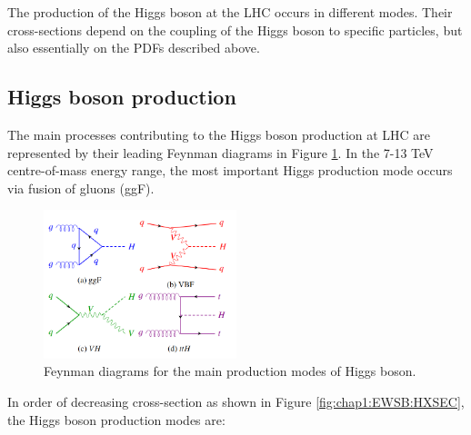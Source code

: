 The production of the Higgs boson at the LHC occurs in different modes. Their cross-sections depend on the coupling of the Higgs boson to specific particles, but also essentially on the PDFs described above.

\subsection{Higgs boson production}
\label{chap1:EWSB:HP}
The main processes contributing to the Higgs boson production at LHC are represented by their leading Feynman diagrams in Figure \ref{fig:chap1:EWSB:HP}. In the 7-13 TeV centre-of-mass energy range, the most important Higgs production mode occurs via fusion of gluons (ggF). 
\begin{figure}[htbp]
    \centering
    \includegraphics[width=0.5\textwidth]{Ch1/Img/Higgs_prod_modes.png}
    \caption{Feynman diagrams for the main production modes of Higgs boson.}
    \label{fig:chap1:EWSB:HP}
\end{figure}
In order of decreasing cross-section as shown in Figure \ref{fig:chap1:EWSB:HXSEC}, the Higgs boson production modes are:
